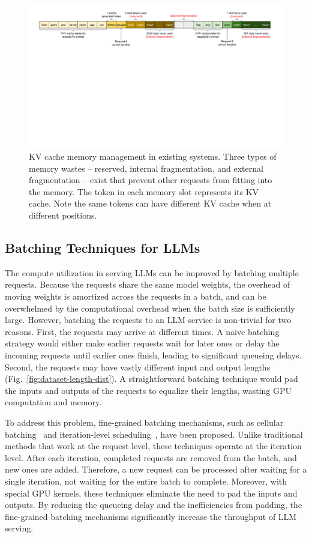 \documentclass[sigplan,10pt]{acmart}
\begin{document}
\begin{figure}[t]
    \centering
    \includegraphics[width=.85\linewidth]{figures/baseline-memory-management.pdf}
    \vspace{-5pt}
    \caption{KV cache memory management in existing systems. Three types of memory wastes -- reserved, internal fragmentation, and external fragmentation -- exist that prevent other requests from fitting into the memory. The token in each memory slot represents its KV cache. Note the same tokens can have different KV cache when at different positions.}
    \label{fig:existing-memory-management}
\end{figure}

\vspace{-1pt}
\subsection{Batching Techniques for LLMs}
\label{sec:iteration-level-scheduling}

The compute utilization in serving LLMs can be improved by batching multiple requests.
Because the requests share the same model weights, the overhead of moving weights is amortized across the requests in a batch, and can be overwhelmed by the computational overhead when the batch size is sufficiently large.
However, batching the requests to an LLM service is non-trivial for two reasons.
First, the requests may arrive at different times.
A naive batching strategy would either make earlier requests wait for later ones or delay the incoming requests until earlier ones finish, leading to significant queueing delays.
Second, the requests may have vastly different input and output lengths (Fig.~\ref{fig:dataset-length-dist}).
A straightforward batching technique would pad the inputs and outputs of the requests to equalize their lengths, wasting GPU computation and memory.

To address this problem, fine-grained batching mechanisms, such as cellular batching~\cite{gao2018low} and iteration-level scheduling~\cite{yu2022orca}, have been proposed.
Unlike traditional methods that work at the request level, these techniques operate at the iteration level.
After each iteration, completed requests are removed from the batch, and new ones are added.
Therefore, a new request can be processed after waiting for a single iteration, not waiting for the entire batch to complete.
Moreover, with special GPU kernels, these techniques eliminate the need to pad the inputs and outputs.
By reducing the queueing delay and the inefficiencies from padding, the fine-grained batching mechanisms significantly increase the throughput of LLM serving. 
\end{document}
